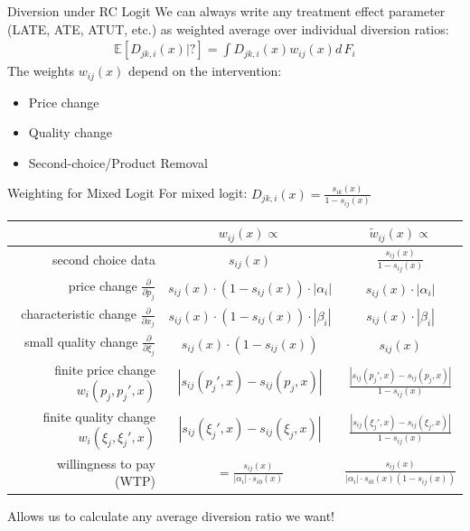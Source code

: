 \documentclass[xcolor=pdftex,dvipsnames,table,mathserif,aspectratio=169]{beamer}
\begin{document}
\begin{frame}{Diversion under RC Logit}
We can always write any treatment effect parameter (LATE, ATE, ATUT, etc.) as weighted average over individual diversion ratios:
\begin{align*}
\mathbb{E}[D_{jk,i}(x) | ?] = \int D_{jk,i}(x) w_{ij}(x) d\, F_i
\end{align*}
The weights $w_{ij}(x)$ depend on the intervention:
\begin{itemize}
\item Price change
\item Quality change
\item Second-choice/Product Removal
\end{itemize}
\end{frame}


\begin{frame}{Weighting for Mixed Logit}
For mixed logit: $D_{jk,i}(x) = \frac{s_{ik}(x)}{1-s_{ij}(x)}$
\begin{center}
\footnotesize
  \begin{tabular}{ r c c  }
\toprule
& $w_{ij}(x) \propto$ & $\widetilde{w}_{ij}(x) \propto$ \\ \midrule
second choice data & $s_{ij}(x)$
& $\frac{s_{ij}(x)}{1-s_{ij}(x)}$\\ 
 price change  $\frac{\partial }{\partial p_j}$ 
 & $s_{ij}(x) \cdot (1- s_{ij}(x)) \cdot |\alpha_i| $ 
 & $s_{ij}(x)  \cdot |\alpha_i| $\\\
 characteristic change $\frac{\partial }{\partial x_j}$ 
 &$s_{ij}(x) \cdot (1- s_{ij}(x)) \cdot |\beta_i|$ 
 &$s_{ij}(x) \cdot |\beta_i|$ \\
 small quality change $ \frac{\partial }{\partial \xi_j}$
  & $ s_{ij}(x) \cdot (1- s_{ij}(x))$ 
  & $ s_{ij}(x) $ \\
 finite price change $ w_i(p_j,p_j',x) $ 
 &  $|s_{ij}(p_j',x) -s_{ij}(p_j,x)| $
  & $\frac{|s_{ij}(p_j',x) -s_{ij}(p_j,x)|}{1- s_{ij}(x)}$ \\
 finite quality change $w_i(\xi_j,\xi_j',x)$
  & $|s_{ij}(\xi_j',x) -s_{ij}(\xi_j,x)|$ 
 & $\frac{|s_{ij}(\xi_j',x) -s_{ij}(\xi_j,x)|}{1- s_{ij}(x)}$ \\
willingness to pay (WTP) 
 & $=\frac{s_{ij}(x)}{|\alpha_i| \cdot s_{i0}(x)}$
 & $\frac{s_{ij}(x)}{|\alpha_i| \cdot s_{i0}(x) (1-s_{ij}(x))}$\\
  \bottomrule
  \end{tabular}
\end{center}
Allows us to calculate any average diversion ratio we want!
\end{frame}
\end{document}
